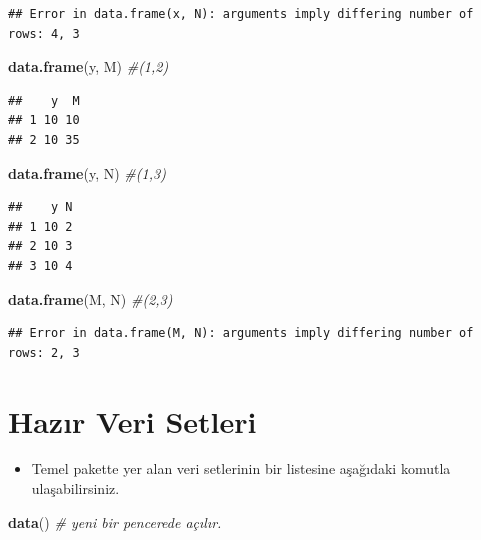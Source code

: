 \documentclass[
  oneside]{book}
\newenvironment{Shaded}{\begin{snugshade}}{\end{snugshade}}
\newcommand{\CommentTok}[1]{\textcolor[rgb]{0.56,0.35,0.01}{\textit{#1}}}
\newcommand{\FunctionTok}[1]{\textcolor[rgb]{0.13,0.29,0.53}{\textbf{#1}}}
\newcommand{\NormalTok}[1]{#1}
\providecommand{\tightlist}{%
  \setlength{\itemsep}{0pt}\setlength{\parskip}{0pt}}
\begin{document}
\begin{verbatim}
## Error in data.frame(x, N): arguments imply differing number of rows: 4, 3
\end{verbatim}

\begin{Shaded}
\begin{Highlighting}[]
\FunctionTok{data.frame}\NormalTok{(y, M) }\CommentTok{\#(1,2)}
\end{Highlighting}
\end{Shaded}

\begin{verbatim}
##    y  M
## 1 10 10
## 2 10 35
\end{verbatim}

\begin{Shaded}
\begin{Highlighting}[]
\FunctionTok{data.frame}\NormalTok{(y, N) }\CommentTok{\#(1,3)}
\end{Highlighting}
\end{Shaded}

\begin{verbatim}
##    y N
## 1 10 2
## 2 10 3
## 3 10 4
\end{verbatim}

\begin{Shaded}
\begin{Highlighting}[]
\FunctionTok{data.frame}\NormalTok{(M, N) }\CommentTok{\#(2,3)}
\end{Highlighting}
\end{Shaded}

\begin{verbatim}
## Error in data.frame(M, N): arguments imply differing number of rows: 2, 3
\end{verbatim}

\hypertarget{hazux131r-veri-setleri}{%
\section{Hazır Veri Setleri}\label{hazux131r-veri-setleri}}

\begin{itemize}
\tightlist
\item
  Temel pakette yer alan veri setlerinin bir listesine aşağıdaki komutla ulaşabilirsiniz.
\end{itemize}

\begin{Shaded}
\begin{Highlighting}[]
\FunctionTok{data}\NormalTok{() }\CommentTok{\# yeni bir pencerede açılır.}
\end{Highlighting}
\end{Shaded}
\end{document}
